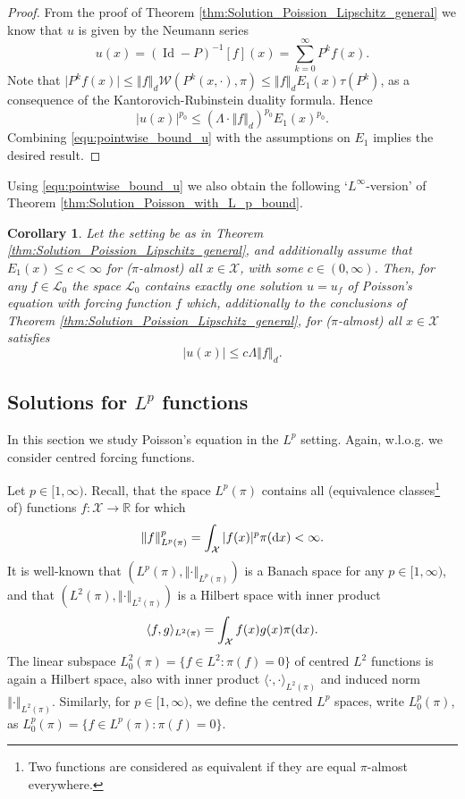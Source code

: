 \documentclass[12pt]{article}
\theoremstyle{plain}
\newtheorem{cor}[thm]{Corollary}
\renewcommand{\d}{{\rm d}}
\newcommand{\norm}[1]{\left\Vert #1 \right\Vert}
\newcommand{\R}{\mathbb{R}}
\newcommand{\cX}{\mathcal{X}}
\DeclareMathOperator{\Id}{\text{Id}}
\begin{document}
{\begin{proof}
From the proof of Theorem \ref{thm:Solution_Poission_Lipschitz_general} we know that $u $ is given by the Neumann series
\[
u(x) = (\Id-P)^{-1} [f]  (x) = \sum_{k=0}^\infty P^k f(x).
\]
Note that $\vert P^k f(x)\vert \leq \norm{f}_d \mathcal{W}(P^k(x, \cdot), \pi) \leq \norm{f}_d E_1(x) \tau(P^k)$, as a consequence of the Kantorovich-Rubinstein duality formula. Hence 
\begin{equation}\label{equ:pointwise_bound_u}
\vert u(x) \vert^{p_0} \leq \left(\Lambda \cdot \norm{f}_d \right)^{p_0} E_1(x)^{p_0}. 
\end{equation}
Combining \eqref{equ:pointwise_bound_u} with the assumptions on $E_1$ implies the desired result. 
\end{proof}

Using \eqref{equ:pointwise_bound_u} we also obtain the following `$L^\infty$-version' of Theorem \ref{thm:Solution_Poisson_with_L_p_bound}. 

 
\begin{cor}
Let the setting be as in Theorem \ref{thm:Solution_Poission_Lipschitz_general}, and additionally assume that $E_1(x) \leq c < \infty$ for ($\pi$-almost) all $x \in \cX$, with some $c \in (0, \infty)$. Then, for any $f \in \mathscr{L}_0$ the space $\mathscr{L}_0$ contains exactly one solution $u = u_f$ of Poisson's equation with forcing function $f$ which, additionally to the conclusions of Theorem \ref{thm:Solution_Poission_Lipschitz_general}, for ($\pi$-almost) all $x \in \cX$ satisfies
\[
\vert u(x) \vert \leq c \Lambda \norm{f}_d.
\]
\end{cor}



\subsection{Solutions for $L^p$ functions}
In this section we study Poisson's equation in the $L^p$ setting. 
Again, w.l.o.g. we consider centred forcing functions.

Let $p\in [1, \infty)$.
Recall, that the space $L^p(\pi)$ contains all (equivalence classes\footnote{Two functions are considered as equivalent if they are equal $\pi$-almost everywhere.} of) functions $f \colon \cX \to \R$ for which 
\[
\norm{f}_{L^p(\pi)}^p = \int_\cX \vert f(x)\vert^p \pi(\d x) <\infty.
\]
It is well-known that $(L^p(\pi), \norm{\cdot}_{L^{p}(\pi)})$ is a Banach space for any $p\in [1, \infty)$, and that $(L^2(\pi), \norm{\cdot}_{L^2(\pi)})$ is a Hilbert space with inner product
\[
\langle f, g \rangle_{L^2(\pi)} = \int_\cX f(x) g(x) \pi(\d x). 
\]
The linear subspace $L_0^2(\pi) = \{ f \in L^2 \colon \pi(f)=0\}$ of centred $L^2$ functions is again a Hilbert space, also with inner product $\langle \cdot , \cdot  \rangle_{L^2(\pi)}$ and induced norm $\norm{\cdot }_{L^2(\pi)}$. 
Similarly,  for $p \in [1,\infty)$, we define the centred $L^p$ spaces, write $L^p_0(\pi)$, as $L_0^p(\pi) = \{ f \in L^p(\pi) \colon \pi(f) =0\}$.


}
\end{document}
